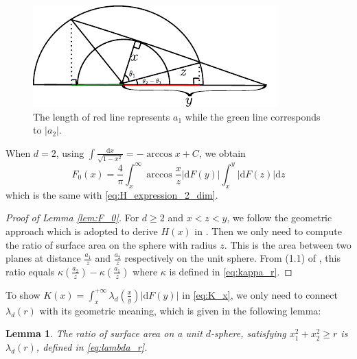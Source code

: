 \documentclass[conference,a4paper]{IEEEtran}
\def\dd{\mathrm{d}}
\newtheorem{lemma}{Lemma}
\begin{document}
\begin{figure}[!ht]
     \centering
     \includegraphics[width=0.8\linewidth]{dessin.pdf}
     \caption{The length of red line represents $a_1$ while the green line corresponds to $|a_2|$.}
     \label{fig:a1a2}
\end{figure}
When $d=2$, using $\int \frac{\dd x}{\sqrt{1-x^2}} = -\arccos x + C$,
we obtain
$$
F_0(x)=\frac{4}{\pi} \int_x^{\infty} \arccos\frac{x}{z}|\dd F(y)|
\int_x^{y} |\dd F(z)|\dd z
$$
which is the same with \eqref{eq:H_expression_2_dim}.
\begin{proof}[Proof of Lemma \ref{lem:F_0}]
For $d\geq 2$ and $x<z<y$, we follow the geometric approach
which is adopted to derive
$H(x)$ in \cite{carnal1970konvexe}.
Then we only need to compute the ratio of surface area
on the sphere with radius $z$. This is the area between
two planes at distance $\frac{a_1}{z}$ and $\frac{a_2}{z}$
respectively on the unit sphere. From (1.1) of \cite{dwyer1991convex},
this ratio equals $\kappa(\frac{a_2}{z}) - \kappa(\frac{a_1}{z})$
where $\kappa$ is defined in \eqref{eq:kappa_r}.

\end{proof}
To show 
$K(x) = \int_x^{+\infty} \lambda_d(\frac{x}{y})|\dd F(y)|$
in \eqref{eq:K_x},
we only need to connect $\lambda_d(r)$ with its geometric meaning,
which is given in the following lemma:
\begin{lemma}
     The ratio of surface area on a unit $d$-sphere,
     satisfying $x_1^2+x_2^2\geq r$ is $\lambda_d(r)$,
     defined in \eqref{eq:lambda_r}.
\end{lemma}
\end{document}

